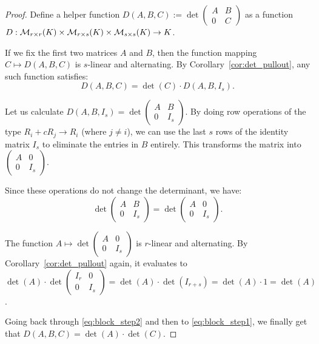 \begin{proof}
  Define a helper function $D(A, B, C) := \det \left(\begin{smallmatrix} A & B \\ 0 & C \end{smallmatrix}\right)$ as a function $D : \mathcal{M}_{r \times r}(K) \times \mathcal{M}_{r \times s}(K) \times \mathcal{M}_{s \times s}(K) \to K$.

  If we fix the first two matrices $A$ and $B$, then the function mapping $C \mapsto D(A, B, C)$ is $s$-linear and alternating. By Corollary~\ref{cor:det_pullout}, any such function satisfies:
  \begin{equation} \label{eq:block_step1}
    D(A, B, C) = \det(C) \cdot D(A, B, I_s).
  \end{equation}

  Let us calculate $D(A, B, I_s) = \det \left ( \begin{smallmatrix} A & B \\ 0 & I_s \end{smallmatrix}\right)$. By doing row operations of the type $R_i + c R_j \to R_i$ (where $j \neq i$), we can use the last $s$ rows of the identity matrix $I_s$ to eliminate the entries in $B$ entirely. This transforms the matrix into $\left(\begin{smallmatrix} A & 0 \\ 0 & I_s \end{smallmatrix}\right)$.

  Since these operations do not change the determinant, we have:
  \begin{equation} \label{eq:block_step2}
    \det \begin{pmatrix} A & B \\ 0 & I_s \end{pmatrix} = \det \begin{pmatrix} A & 0 \\ 0 & I_s \end{pmatrix}.
  \end{equation}

  The function $A \mapsto \det \left(\begin{smallmatrix} A & 0 \\ 0 & I_s \end{smallmatrix}\right)$ is $r$-linear and alternating. By Corollary~\ref{cor:det_pullout} again, it evaluates to $\det(A) \cdot \det \left(\begin{smallmatrix} I_r & 0 \\ 0 & I_s \end{smallmatrix}\right) = \det(A) \cdot \det(I_{r+s}) = \det(A) \cdot 1 = \det(A)$.

  Going back through \eqref{eq:block_step2} and then to \eqref{eq:block_step1}, we finally get that $D(A, B, C) = \det(A) \cdot \det(C)$.
\end{proof}

